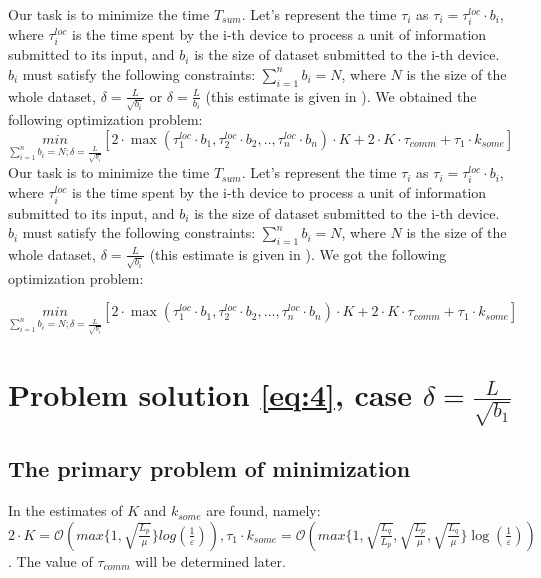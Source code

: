 \documentclass{article}
\begin{document}
Our task is to minimize the time $T_{sum}$. Let's represent the time $\tau_i$ as $\tau_i = \tau_i^{loc}\cdot b_i$, where $\tau_i^{loc}$ is the time spent by the i-th device to process a unit of information submitted to its input, and $b_i$ is the size of dataset submitted to the i-th device. $b_i$ must satisfy the following constraints: $\sum\limits_{i = 1}^{n} b_i = N$, where $N$ is the size of the whole dataset, $\delta = \frac{L}{\sqrt{b_i}}$ or $\delta = \frac{L}{b_i}$ (this estimate is given in \cite{kovalev2022optimal}).
We obtained the following optimization problem:
\begin{equation}
    \label{eq:4}
    \underset{\sum\limits_{i = 1}^{n} b_i = N; \delta = \frac{L}{\sqrt{b_i}}}{min}[ 2\cdot\max(\tau_1^{loc}\cdot b_1, \tau_2^{loc}\cdot b_2, . ., \tau_n^{loc}\cdot b_n)\cdot K + 2\cdot K\cdot\tau_{comm} + \tau_1\cdot k_{some}]
\end{equation}
Our task is to minimize the time $T_{sum}$. Let's represent the time $\tau_i$ as $\tau_i = \tau_i^{loc}\cdot b_i$, where $\tau_i^{loc}$ is the time spent by the i-th device to process a unit of information submitted to its input, and $b_i$ is the size of dataset submitted to the i-th device. $b_i$ must satisfy the following constraints: $\sum\limits_{i = 1}^{n} b_i = N$, where $N$ is the size of the whole dataset, $\delta = \frac{L}{\sqrt{b_i}}$ (this estimate is given in \citep{kovalev2022optimal}).
We got the following optimization problem:

\begin{equation}
    \label{eq:4}
    \underset{\sum\limits_{i = 1}^{n} b_i = N; \delta = \frac{L}{\sqrt{b_i}}}{min}[ 2\cdot\max(\tau_1^{loc}\cdot b_1, \tau_2^{loc}\cdot b_2, ..., \tau_n^{loc}\cdot b_n)\cdot K + 2\cdot K\cdot\tau_{comm} + \tau_1\cdot k_{some}]
\end{equation}

\section{Problem solution \ref{eq:4}, case $\delta = \frac{L}{\sqrt{b_1}}$}

\subsection{The primary problem of minimization}
In \cite{kovalev2022optimal} the estimates of $K$ and $k_{some}$ are found, namely: \\ $2\cdot K = \mathcal O(max\{1, \sqrt{\frac{L_p}{\mu}}\}log(\frac{1}{\varepsilon})), \tau_1\cdot k_{some} = \mathcal O(max\{1, \sqrt{\frac{L_q}{L_p}}, \sqrt{\frac{L_p}{\mu}}, \sqrt{\frac{L_q}{\mu}}\}\log(\frac{1}{\varepsilon}))$. The value of $\tau_{comm}$ will be determined later. 
\end{document}
